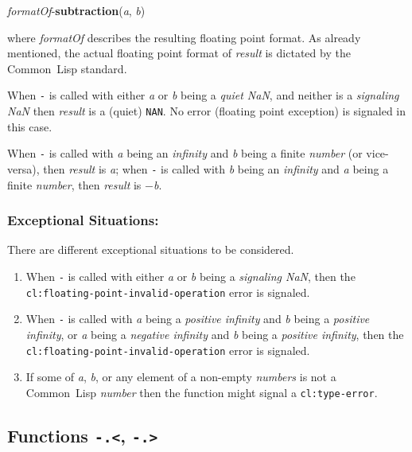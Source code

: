 \documentclass[10pt,fleqn]{article}
\newcommand{\CL}{\textsf{Common~Lisp}}
\newcommand{\code}[1]{\texttt{#1}}
\newcommand{\clieeeterm}[1]{\textit{#1}}
\newcommand{\varname}[1]{\textit{#1}}
\newcommand{\clterm}[1]{\textit{#1}}
\newcommand{\clname}[1]{\texttt{#1}}
\newcommand{\DDictionaryItem}[1]{\vspace*{6pt}\noindent\hrulefill\vspace*{-9pt}\subsection*{#1}}
\newcommand{\DExceptional}{\subsubsection*{Exceptional Situations:}}
\begin{document}
\noindent
\textit{formatOf}-\textbf{subtraction}(\varname{a}, \varname{b})

\vspace*{3mm}

\noindent
where \textit{formatOf} describes the resulting floating point
format.  As already mentioned, the actual floating point format of
\varname{result} is dictated by the \CL{} standard.

When \code{-} is called with either \varname{a} or \varname{b} being a
\emph{quiet NaN}, and neither is a \emph{signaling NaN} then
\varname{result} is a (quiet) \code{NAN}.  No error (floating point
exception) is signaled in this case.

When \code{-} is called with \varname{a} being an 
\clieeeterm{infinity} and \varname{b} being a finite \clterm{number}
(or vice-versa), then \varname{result} is \varname{a}; when \code{-} is
called with \varname{b} being an \clieeeterm{infinity} and \varname{a}
being a finite \clterm{number}, then \varname{result}
is $-$\varname{b}.


\DExceptional{}

There are different exceptional situations to be considered.

\begin{enumerate}
\item When \code{-} is called with either \varname{a} or \varname{b}
  being a \emph{signaling NaN}, then the\\
  \clname{cl:floating-point-invalid-operation} error is signaled.

\item When \code{-} is called with \varname{a} being a
  \clieeeterm{positive infinity} and \varname{b} being a
  \clieeeterm{positive infinity}, or \varname{a} being a
  \clieeeterm{negative infinity} and \varname{b} being a
  \clieeeterm{positive infinity}, then the\\
  \clname{cl:floating-point-invalid-operation} error is signaled.

\item If some of \varname{a}, \varname{b}, or any element of a non-empty
  \varname{numbers} is not a \CL{} \clterm{number} then the function
  might signal a \clname{cl:type-error}.
\end{enumerate}


\DDictionaryItem{Functions \code{-.<}, \code{-.>}}
\index{*!\code{-.<}}
\index{*!\code{-.>}}
\end{document}
